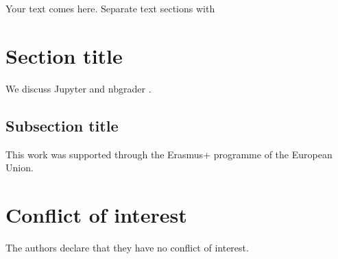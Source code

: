 \documentclass[twocolumn]{svjour3}          %
\begin{document}
Your text comes here. Separate text sections with

\section{Section title}
\label{sec:1}
We discuss Jupyter \cite{jupyter-edu-book} and nbgrader \cite{nbgrader}.

\subsection{Subsection title}
\label{sec:2}



\begin{acknowledgements}
This work was supported through the Erasmus+ programme of the
European Union.
\end{acknowledgements}


\section*{Conflict of interest}
The authors declare that they have no conflict of interest.
\end{document}
